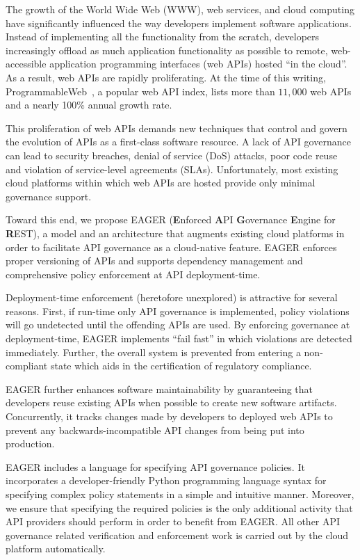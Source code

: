 The growth of the World Wide Web (WWW), web services, and cloud computing have
significantly influenced the way developers implement software applications.
Instead of implementing all the functionality from the scratch, developers
increasingly offload as much application functionality as possible to remote,
web-accessible application programming interfaces (web APIs) hosted ``in the
cloud''. As a result, web APIs are rapidly proliferating.
At the time of this writing, 
ProgrammableWeb~\cite{pweb}, a popular web API index, lists more than $11,000$
web APIs and a nearly 100\% annual growth rate. 

This proliferation of web APIs demands new techniques that
control and govern the evolution of APIs as a first-class software
resource. A lack of API governance can lead to 
security breaches, denial of service (DoS)
attacks, poor code reuse and violation of service-level agreements (SLAs). 
Unfortunately, most existing cloud platforms
within which web APIs are hosted provide only minimal governance support.

Toward this end, we propose EAGER ({\bf E}nforced {\bf A}PI {\bf G}overnance
{\bf E}ngine for {\bf R}EST), a model and an architecture that augments existing
cloud platforms in order to facilitate API governance as a 
cloud-native feature. EAGER enforces proper versioning of APIs and supports dependency 
management and comprehensive policy enforcement at API deployment-time. 

Deployment-time enforcement (heretofore unexplored) is attractive for several
reasons.  First, if run-time only API governance is implemented, 
policy violations will go undetected until the offending APIs are used.  
By enforcing governance at deployment-time,
EAGER implements ``fail fast'' in which violations are detected
immediately. Further, the overall
system is prevented from entering a non-compliant state which aids in the
certification of regulatory compliance. 

EAGER further enhances software maintainability by guaranteeing that 
developers reuse existing APIs when possible to create new software artifacts. 
Concurrently, it
tracks changes made by developers to deployed web APIs to prevent
any backwards-incompatible API changes from being put into production.

EAGER includes a language for specifying 
API governance policies.  It incorporates a developer-friendly 
Python programming language syntax for 
specifying complex policy statements in a simple and 
intuitive manner. Moreover, we ensure that specifying the required policies 
is the only additional activity that API providers should perform in
order to benefit from EAGER. All other API governance related verification and 
enforcement work is carried out by the cloud platform automatically.

